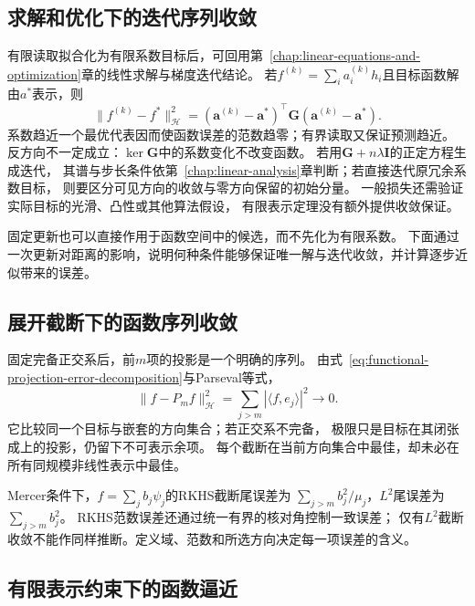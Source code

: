 \subsection{求解和优化下的迭代序列收敛}
\label{sec:functional-iteration-convergence}

有限读取拟合化为有限系数目标后，可回用第~\ref{chap:linear-equations-and-optimization}章的线性求解与梯度迭代结论。
若$f^{(k)}=\sum_i a_i^{(k)}h_i$且目标函数解由$a^*$表示，则
\[
 \lVert f^{(k)}-f^*\rVert_{\mathcal H}^2
 =(\bm a^{(k)}-\bm a^*)^\top\bm G(\bm a^{(k)}-\bm a^*).
\]
系数趋近一个最优代表因而使函数误差的范数趋零；有界读取又保证预测趋近。
反方向不一定成立：$\ker\bm G$中的系数变化不改变函数。
若用$\bm G+n\lambda\bm I$的正定方程生成迭代，
其谱与步长条件依第~\ref{chap:linear-analysis}章判断；若直接迭代原冗余系数目标，
则要区分可见方向的收敛与零方向保留的初始分量。
一般损失还需验证实际目标的光滑、凸性或其他算法假设，
有限表示定理没有额外提供收敛保证。

固定更新也可以直接作用于函数空间中的候选，而不先化为有限系数。
下面通过一次更新对距离的影响，说明何种条件能够保证唯一解与迭代收敛，并计算逐步近似带来的误差。



\subsection{展开截断下的函数序列收敛}
\label{sec:functional-truncation-convergence}

固定完备正交系后，前$m$项的投影是一个明确的序列。
由式~\eqref{eq:functional-projection-error-decomposition}与Parseval等式，
\[
 \lVert f-P_mf\rVert_{\mathcal H}^2
 =\sum_{j>m}|\langle f,e_j\rangle|^2\to0.
\]
它比较同一个目标与嵌套的方向集合；若正交系不完备，
极限只是目标在其闭张成上的投影，仍留下不可表示余项。
每个截断在当前方向集合中最佳，却未必在所有同规模非线性表示中最佳。

Mercer条件下，$f=\sum_j b_j\psi_j$的RKHS截断尾误差为
$\sum_{j>m}b_j^2/\mu_j$，$L^2$尾误差为$\sum_{j>m}b_j^2$。
RKHS范数误差还通过统一有界的核对角控制一致误差；
仅有$L^2$截断收敛不能作同样推断。定义域、范数和所选方向决定每一项误差的含义。

\subsection{有限表示约束下的函数逼近}
\label{sec:functional-approximation-capacity-representation}

